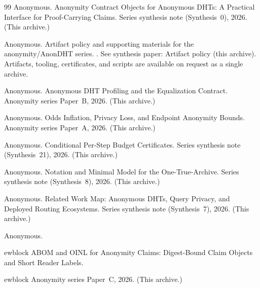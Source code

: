 \documentclass[11pt]{article}
\begin{document}
\begin{thebibliography}{99}
Anonymous.
\newblock Anonymity Contract Objects for Anonymous DHTs: A Practical Interface for Proof-Carrying Claims.
\newblock Series synthesis note (Synthesis~0), 2026. (This archive.)

Anonymous.
\newblock Artifact policy and supporting materials for the anonymity/AnonDHT series.
.
\newblock See synthesis paper: Artifact policy (this archive). Artifacts, tooling, certificates, and scripts are available on request as a single archive.

Anonymous.
\newblock Anonymous {DHT} Profiling and the Equalization Contract.
\newblock Anonymity series Paper~B, 2026. (This archive.)


Anonymous.
\newblock Odds Inflation, Privacy Loss, and Endpoint Anonymity Bounds.
\newblock Anonymity series Paper~A, 2026. (This archive.)

Anonymous.
\newblock Conditional Per-Step Budget Certificates.
\newblock Series synthesis note (Synthesis~21), 2026. (This archive.)

Anonymous.
\newblock Notation and Minimal Model for the One-True-Archive.
\newblock Series synthesis note (Synthesis~8), 2026. (This archive.)

Anonymous.
\newblock Related Work Map: Anonymous {DHT}s, Query Privacy, and Deployed Routing Ecosystems.
\newblock Series synthesis note (Synthesis~7), 2026. (This archive.)


Anonymous.

ewblock ABOM and OINL for Anonymity Claims: Digest-Bound Claim Objects and Short Reader Labels.

ewblock Anonymity series Paper~C, 2026. (This archive.)

\end{thebibliography}
\end{document}

